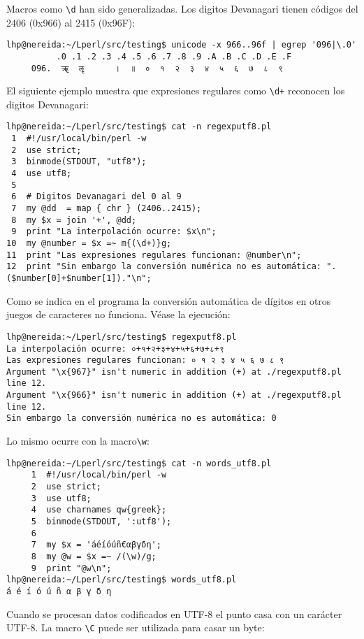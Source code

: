 \begin{htmlonly}
\begin{htmlonly}
Macros como \verb|\d| han sido generalizadas.
Los digitos Devanagari tienen códigos
del 2406 (0x966) al 2415 (0x96F):
\begin{verbatim}
lhp@nereida:~/Lperl/src/testing$ unicode -x 966..96f | egrep '096|\.0'
          .0 .1 .2 .3 .4 .5 .6 .7 .8 .9 .A .B .C .D .E .F
     096.  ॠ  ॡ      ।  ॥  ०  १  २  ३  ४  ५  ६  ७  ८  ९
\end{verbatim}
El siguiente ejemplo muestra que  expresiones regulares como \verb|\d+| 
reconocen los digitos Devanagari:
\begin{verbatim}
lhp@nereida:~/Lperl/src/testing$ cat -n regexputf8.pl
 1  #!/usr/local/bin/perl -w
 2  use strict;
 3  binmode(STDOUT, "utf8");
 4  use utf8;
 5
 6  # Digitos Devanagari del 0 al 9
 7  my @dd  = map { chr } (2406..2415);
 8  my $x = join '+', @dd;
 9  print "La interpolación ocurre: $x\n";
10  my @number = $x =~ m{(\d+)}g;
11  print "Las expresiones regulares funcionan: @number\n";
12  print "Sin embargo la conversión numérica no es automática: ".($number[0]+$number[1])."\n";
\end{verbatim}

Como se indica en el programa la conversión automática de dígitos en 
otros juegos de caracteres no funciona. Véase la ejecución:

\begin{verbatim}
lhp@nereida:~/Lperl/src/testing$ regexputf8.pl
La interpolación ocurre: ०+१+२+३+४+५+६+७+८+९
Las expresiones regulares funcionan: ० १ २ ३ ४ ५ ६ ७ ८ ९
Argument "\x{967}" isn't numeric in addition (+) at ./regexputf8.pl line 12.
Argument "\x{966}" isn't numeric in addition (+) at ./regexputf8.pl line 12.
Sin embargo la conversión numérica no es automática: 0
\end{verbatim}

Lo mismo ocurre con la macro\verb|\w|:

\begin{verbatim}
lhp@nereida:~/Lperl/src/testing$ cat -n words_utf8.pl
     1  #!/usr/local/bin/perl -w
     2  use strict;
     3  use utf8;
     4  use charnames qw{greek};
     5  binmode(STDOUT, ':utf8');
     6
     7  my $x = 'áéíóúñ€αβγδη';
     8  my @w = $x =~ /(\w)/g;
     9  print "@w\n";
lhp@nereida:~/Lperl/src/testing$ words_utf8.pl
á é í ó ú ñ α β γ δ η
\end{verbatim}


Cuando se procesan datos codificados en UTF-8 el punto casa
con un carácter UTF-8. La macro \verb|\C| puede ser 
utilizada para casar un byte:


\end{htmlonly}
\end{htmlonly}
